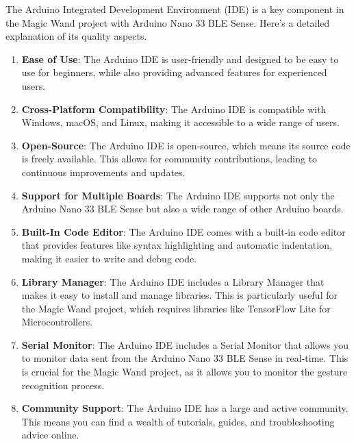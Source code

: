 The Arduino Integrated Development Environment (IDE) is a key component in the Magic Wand project with Arduino Nano 33 BLE Sense. Here’s a detailed explanation of its quality aspects.\cite{Fezari:2018}

\begin{enumerate}
	\item \textbf{Ease of Use}: The Arduino IDE is user-friendly and designed to be easy to use for beginners, while also providing advanced features for experienced users.
	
	\item \textbf{Cross-Platform Compatibility}: The Arduino IDE is compatible with Windows, macOS, and Linux, making it accessible to a wide range of users.
	
	\item \textbf{Open-Source}: The Arduino IDE is open-source, which means its source code is freely available. This allows for community contributions, leading to continuous improvements and updates.
	
	\item \textbf{Support for Multiple Boards}: The Arduino IDE supports not only the Arduino Nano 33 BLE Sense but also a wide range of other Arduino boards.
	
	\item \textbf{Built-In Code Editor}: The Arduino IDE comes with a built-in code editor that provides features like syntax highlighting and automatic indentation, making it easier to write and debug code.
	
	\item \textbf{Library Manager}: The Arduino IDE includes a Library Manager that makes it easy to install and manage libraries. This is particularly useful for the Magic Wand project, which requires libraries like TensorFlow Lite for Microcontrollers.
	
	\item \textbf{Serial Monitor}: The Arduino IDE includes a Serial Monitor that allows you to monitor data sent from the Arduino Nano 33 BLE Sense in real-time. This is crucial for the Magic Wand project, as it allows you to monitor the gesture recognition process.
	
	\item \textbf{Community Support}: The Arduino IDE has a large and active community. This means you can find a wealth of tutorials, guides, and troubleshooting advice online.
\end{enumerate}


